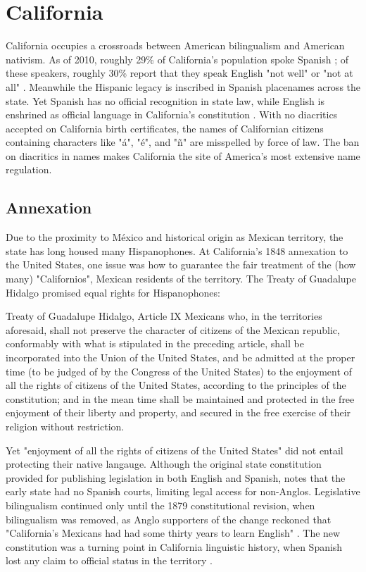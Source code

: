 \section{California}

California occupies a crossroads between American bilingualism and American
nativism. As of 2010, roughly 29\% of California's population spoke Spanish ; of
these speakers, roughly 30\% report that they speak English "not well" or "not
at all" \parencite{acs-lang-states}. Meanwhile the Hispanic legacy is inscribed
in Spanish placenames across the state. Yet Spanish has no official recognition
in state law, while English is enshrined as official language in California's
constitution \parencite{ca-const}. With no diacritics accepted on California
birth certificates, the names of Californian citizens containing characters like
"á", "é", and "ñ" are misspelled by force of law. The ban on diacritics in names
makes California the site of America's most extensive name regulation.

\subsection{Annexation}

Due to the proximity to México and historical origin as Mexican territory, the
state has long housed many Hispanophones. At California's 1848 annexation to the
United States, one issue was how to guarantee the fair treatment of the (how many)
"Californios", Mexican residents of the territory. The Treaty of Guadalupe
Hidalgo promised equal rights for Hispanophones: 

\begin{aquote}{Treaty of Guadalupe Hidalgo, Article IX}
	Mexicans who, in the territories aforesaid, shall not preserve the character
	of citizens of the Mexican republic, conformably with what is stipulated in
	the preceding article, shall be incorporated into the Union of the United
	States, and be admitted at the proper time (to be judged of by the Congress of
	the United States) to the enjoyment of all the rights of citizens of the
	United States, according to the principles of the constitution; and in the
	mean time shall be maintained and protected in the free enjoyment of their
	liberty and property, and secured in the free exercise of their religion
	without restriction. \parencite{guadalupe}
\end{aquote}

Yet "enjoyment of all the rights of citizens of the United States" did not
entail protecting their native langauge. Although the original state
constitution provided for publishing legislation in both English and Spanish,
\textcite{lamar-prieto14} notes that the early state had no Spanish courts,
limiting legal access for non-Anglos. Legislative bilingualism continued only
until the 1879 constitutional revision, when bilingualism was removed, as Anglo
supporters of the change reckoned that "California's Mexicans had had some
thirty years to learn English" \parencite{baron92}. The new constitution
was a turning point in California linguistic history, when Spanish lost any
claim to official status in the territory \parencite{baron92}. 

